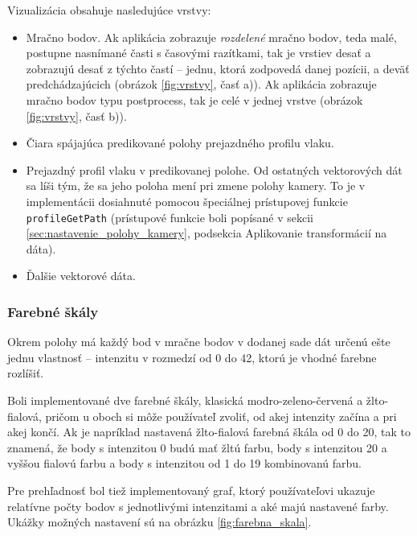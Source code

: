 Vizualizácia obsahuje nasledujúce vrstvy:
\begin{itemize}
    \item Mračno bodov. Ak aplikácia zobrazuje \emph{rozdelené} mračno bodov, teda malé, postupne nasnímané časti s časovými razítkami, tak je vrstiev desať a zobrazujú desať z týchto častí -- jednu, ktorá zodpovedá danej pozícii, a deväť predchádzajúcich (obrázok \ref{fig:vrstvy}, časť a)). Ak aplikácia zobrazuje mračno bodov typu postprocess, tak je celé v jednej vrstve (obrázok \ref{fig:vrstvy}, časť b)).
    \item Čiara spájajúca predikované polohy prejazdného profilu vlaku.
    \item Prejazdný profil vlaku v predikovanej polohe. Od ostatných vektorových dát sa líši tým, že sa jeho poloha mení pri zmene polohy kamery. To je v implementácii dosiahnuté pomocou špeciálnej prístupovej funkcie \texttt{profileGetPath} (prístupové funkcie boli popísané v sekcii \ref{sec:nastavenie_polohy_kamery}, podsekcia Aplikovanie transformácií na dáta). 
    \item Ďalšie vektorové dáta.
\end{itemize}

\subsubsection{Farebné škály}

Okrem polohy má každý bod v mračne bodov v dodanej sade dát určenú ešte jednu vlastnosť -- intenzitu v rozmedzí od 0 do 42, ktorú je vhodné farebne rozlíšiť.

Boli implementované dve farebné škály, klasická modro-zeleno-červená a žlto-fialová, pričom u oboch si môže používateľ zvoliť, od akej intenzity začína a pri akej končí. Ak je napríklad nastavená žlto-fialová farebná škála od 0 do 20, tak to znamená, že body s intenzitou 0 budú mať žltú farbu, body s intenzitou 20 a vyššou fialovú farbu a body s intenzitou od 1 do 19 kombinovanú farbu.

Pre prehľadnosť bol tiež implementovaný graf, ktorý používateľovi ukazuje relatívne počty bodov s jednotlivými intenzitami a aké majú nastavené farby. Ukážky možných nastavení sú na obrázku \ref{fig:farebna_skala}.

